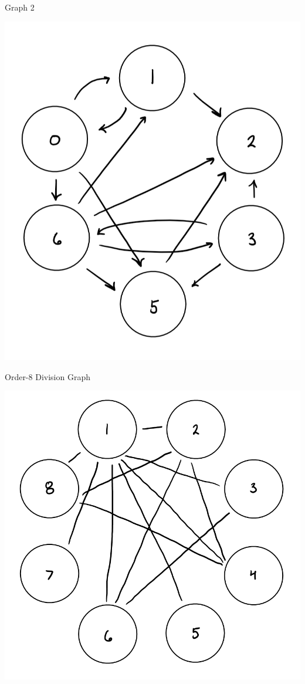 \documentclass[12pt,twoside]{article}
\begin{document}
\begin{problems}
\begin{problemparts}
    Graph 2
    \begin{center}
        \includegraphics[scale=0.35]{Images/P1Aii.PNG}
    \end{center}

\problempart Order-8 Division Graph
    \begin{center}
        \includegraphics[scale=0.35]{Images/P1B.PNG}
    \end{center}


\end{problemparts}
\end{problems}
\end{document}
